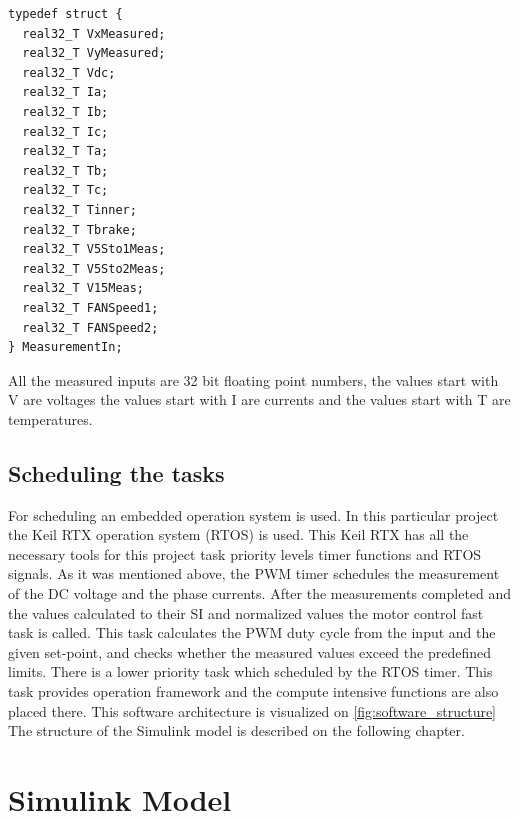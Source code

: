 \begin{absolutelynopagebreak}
\begin{lstlisting}
typedef struct { 
  real32_T VxMeasured; 
  real32_T VyMeasured; 
  real32_T Vdc; 
  real32_T Ia; 
  real32_T Ib; 
  real32_T Ic; 
  real32_T Ta; 
  real32_T Tb; 
  real32_T Tc; 
  real32_T Tinner; 
  real32_T Tbrake; 
  real32_T V5Sto1Meas; 
  real32_T V5Sto2Meas; 
  real32_T V15Meas; 
  real32_T FANSpeed1; 
  real32_T FANSpeed2; 
} MeasurementIn;

\end{lstlisting}
\end{absolutelynopagebreak}

All the measured inputs are 32 bit floating point numbers, the values start with V are voltages the values start with I are currents and the values start with T are temperatures.

\subsection{Scheduling the tasks}
For scheduling an embedded operation system is used. In this particular project the Keil RTX operation system (RTOS) is used. This Keil RTX has all the necessary tools for this project task priority levels timer functions and RTOS signals. As it was mentioned above, the PWM timer schedules the measurement of the DC voltage and the phase currents. After the measurements completed and the values calculated to their SI and normalized values the motor control fast task is called. This task calculates the PWM duty cycle from the input and the given set-point, and checks whether the measured values exceed the predefined limits. 
There is a lower priority task which scheduled by the RTOS timer. This task provides operation framework and the compute intensive functions are also placed there. This software architecture is visualized on \ref{fig:software_structure} The structure of the Simulink model is described on the following chapter.



\section{Simulink Model}

